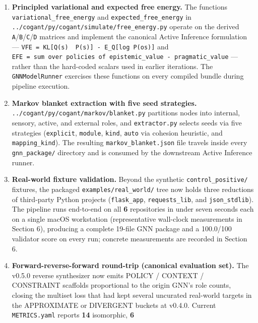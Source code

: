 \documentclass[
]{article}
\begin{document}
\begin{enumerate}
  underlying program graph edges. Rows and vectors are normalized to
  valid probability distributions, so the emitted bundle is directly
  compliant with the Active Inference Institute's upstream GNN
  validator.
\item
  \textbf{Principled variational and expected free energy.} The
  functions \texttt{variational\_free\_energy} and
  \texttt{expected\_free\_energy} in
  \texttt{../cogant/py/cogant/simulate/free\_energy.py} operate on the
  derived \texttt{A}/\texttt{B}/\texttt{C}/\texttt{D} matrices and
  implement the canonical Active Inference formulation ---
  \texttt{VFE\ =\ KL{[}Q(s)\ \mid{}\mid{}\ P(s){]}\ -\ E\_Q{[}log\ P(o\mid{}s){]}}
  and
  \texttt{EFE\ =\ sum\ over\ policies\ of\ epistemic\_value\ -\ pragmatic\_value}
  --- rather than the hard-coded scalars used in earlier iterations. The
  \texttt{GNNModelRunner} exercises these functions on every compiled
  bundle during pipeline execution.
\item
  \textbf{Markov blanket extraction with five seed strategies.}
  \texttt{../cogant/py/cogant/markov/blanket.py} partitions nodes into
  internal, sensory, active, and external roles, and
  \texttt{extractor.py} selects seeds via five strategies
  (\texttt{explicit}, \texttt{module}, \texttt{kind}, \texttt{auto} via
  cohesion heuristic, and \texttt{mapping\_kind}). The resulting
  \texttt{markov\_blanket.json} file travels inside every
  \texttt{gnn\_package/} directory and is consumed by the downstream
  Active Inference runner.
\item
  \textbf{Real-world fixture validation.} Beyond the synthetic
  \texttt{control\_positive/} fixtures, the packaged
  \texttt{examples/real\_world/} tree now holds three reductions of
  third-party Python projects (\texttt{flask\_app},
  \texttt{requests\_lib}, and \texttt{json\_stdlib}). The pipeline runs
  end-to-end on all \textbf{6} repositories in under seven seconds each
  on a single macOS workstation (representative wall-clock measurements
  in Section 6), producing a complete 19-file GNN package and a
  100.0/100 validator score on every run; concrete measurements are
  recorded in Section 6.
\item
  \textbf{Forward-reverse-forward round-trip (canonical evaluation
  set).} The v0.5.0 reverse synthesizer now emits POLICY / CONTEXT /
  CONSTRAINT scaffolds proportional to the origin GNN's role counts,
  closing the multiset loss that had kept several uncurated real-world
  targets in the APPROXIMATE or DIVERGENT buckets at v0.4.0. Current
  \texttt{METRICS.yaml} reports \textbf{14} isomorphic, \textbf{6}

\end{enumerate}
\end{document}
